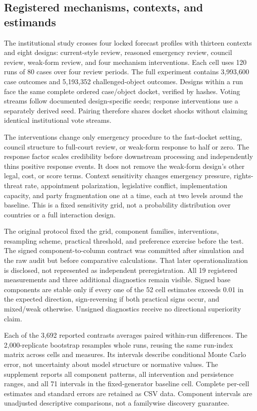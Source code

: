 \documentclass[
  journal=small,
  manuscript=research-article,
  year=2026
]{cup-journal}
\begin{document}


\subsection{Registered mechanisms, contexts, and estimands}

The institutional study crosses four locked forecast profiles with thirteen contexts and eight designs: current-style review, reasoned emergency review, council review, weak-form review, and four mechanism interventions. Each cell uses 120 runs of 80 cases over four review periods. The full experiment contains 3,993,600 case outcomes and 5,193,352 challenged-object outcomes. Designs within a run face the same complete ordered case/object docket, verified by hashes. Voting streams follow documented design-specific seeds; response interventions use a separately derived seed. Pairing therefore shares docket shocks without claiming identical institutional vote streams.

The interventions change only emergency procedure to the fast-docket setting, council structure to full-court review, or weak-form response to half or zero. The response factor scales credibility before downstream processing and independently thins positive response events. It does not remove the weak-form design's other legal, cost, or score terms. Context sensitivity changes emergency pressure, rights-threat rate, appointment polarization, legislative conflict, implementation capacity, and party fragmentation one at a time, each at two levels around the baseline. This is a fixed sensitivity grid, not a probability distribution over countries or a full interaction design.

The original protocol fixed the grid, component families, interventions, resampling scheme, practical threshold, and preference exercise before the test. The signed component-to-column contract was committed after simulation and the raw audit but before comparative calculations. That later operationalization is disclosed, not represented as independent preregistration. All 19 registered measurements and three additional diagnostics remain visible. Signed base components are stable only if every one of the 52 cell estimates exceeds 0.01 in the expected direction, sign-reversing if both practical signs occur, and mixed/weak otherwise. Unsigned diagnostics receive no directional superiority claim.

Each of the 3,692 reported contrasts averages paired within-run differences. The 2,000-replicate bootstrap resamples whole runs, reusing the same run-index matrix across cells and measures. Its intervals describe conditional Monte Carlo error, not uncertainty about model structure or normative values. The supplement reports all component patterns, all intervention and persistence ranges, and all 71 intervals in the fixed-generator baseline cell. Complete per-cell estimates and standard errors are retained as CSV data. Component intervals are unadjusted descriptive comparisons, not a familywise discovery guarantee.
\end{document}
